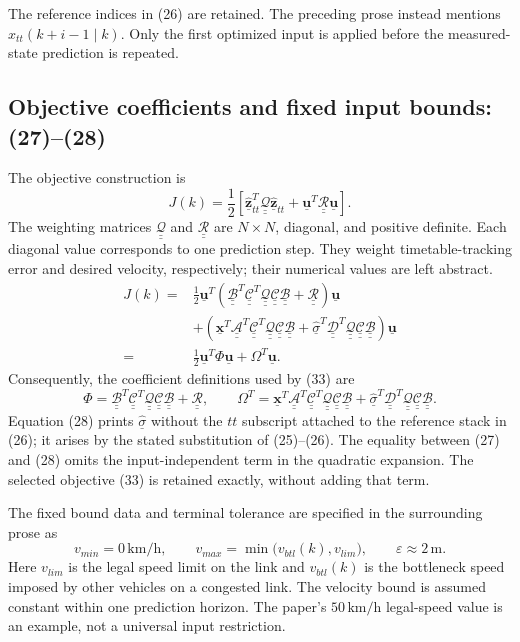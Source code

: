 \documentclass{article}
\newcommand{\uv}{\underline{\mathbf{u}}}
\newcommand{\xv}{\underline{\mathbf{x}}}
\newcommand{\zh}{\underline{\hat{\mathbf{z}}}_{tt}}
\newcommand{\sh}{\underline{\hat{\sigma}}}
\newcommand{\Am}{\underline{\underline{\mathcal A}}}
\newcommand{\Bm}{\underline{\underline{\mathcal B}}}
\newcommand{\Cm}{\underline{\underline{\mathcal C}}}
\newcommand{\Dm}{\underline{\underline{\mathcal D}}}
\newcommand{\Qm}{\underline{\underline{\mathcal Q}}}
\newcommand{\Rm}{\underline{\underline{\mathcal R}}}
\begin{document}
The reference indices in (26) are retained. The preceding prose instead mentions \(x_{tt}(k+i-1\mid k)\). Only the first optimized input is applied before the measured-state prediction is repeated.

\subsection*{Objective coefficients and fixed input bounds: (27)--(28)}
The objective construction is
\begin{equation}
J(k)=\frac12\left[\zh^T\Qm\zh+\uv^T\Rm\uv\right].
\tag{27}
\end{equation}
The weighting matrices \(\Qm\) and \(\Rm\) are \(N\times N\), diagonal, and positive definite. Each diagonal value corresponds to one prediction step. They weight timetable-tracking error and desired velocity, respectively; their numerical values are left abstract.
\begin{equation}
\begin{aligned}
J(k)={}&\frac12\uv^T
\left(\Bm^T\Cm^T\Qm\Cm\Bm+\Rm\right)\uv\\
&+\left(\xv^T\Am^T\Cm^T\Qm\Cm\Bm
+\sh^T\Dm^T\Qm\Cm\Bm\right)\uv\\
={}&\frac12\uv^T\Phi\uv+\Omega^T\uv.
\end{aligned}
\tag{28}
\end{equation}
Consequently, the coefficient definitions used by (33) are
\[
\Phi=\Bm^T\Cm^T\Qm\Cm\Bm+\Rm,
\qquad
\Omega^T=\xv^T\Am^T\Cm^T\Qm\Cm\Bm
+\sh^T\Dm^T\Qm\Cm\Bm.
\]
Equation (28) prints \(\sh\) without the \(tt\) subscript attached to the reference stack in (26); it arises by the stated substitution of (25)--(26). The equality between (27) and (28) omits the input-independent term in the quadratic expansion. The selected objective (33) is retained exactly, without adding that term.

The fixed bound data and terminal tolerance are specified in the surrounding prose as
\[
v_{min}=0\,\mathrm{km/h},\qquad
v_{max}=\min\bigl(v_{btl}(k),v_{lim}\bigr),\qquad
\varepsilon\approx 2\,\mathrm{m}.
\]
Here \(v_{lim}\) is the legal speed limit on the link and \(v_{btl}(k)\) is the bottleneck speed imposed by other vehicles on a congested link. The velocity bound is assumed constant within one prediction horizon. The paper's \(50\,\mathrm{km/h}\) legal-speed value is an example, not a universal input restriction.
\end{document}
